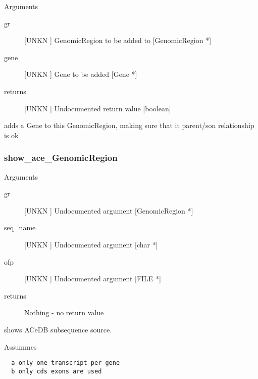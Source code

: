 Arguments
\begin{description}
\item[gr] [UNKN ] GenomicRegion to be added to [GenomicRegion *]
\item[gene] [UNKN ] Gene to be added [Gene *]
\item[returns] [UNKN ] Undocumented return value [boolean]
\end{description}
adds a Gene to this GenomicRegion, making
sure that it parent/son relationship is ok


\subsubsection{show_ace_GenomicRegion}

Arguments
\begin{description}
\item[gr] [UNKN ] Undocumented argument [GenomicRegion *]
\item[seq_name] [UNKN ] Undocumented argument [char *]
\item[ofp] [UNKN ] Undocumented argument [FILE *]
\item[returns] Nothing - no return value
\end{description}
shows ACeDB subsequence source.


Assummes
\begin{verbatim}
  a only one transcript per gene
  b only cds exons are used


\end{verbatim}
